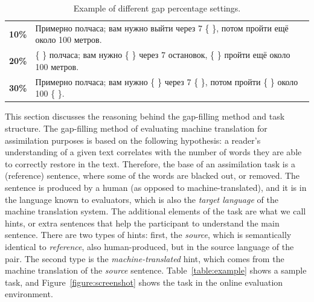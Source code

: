 \documentclass[11pt]{article}
\newcommand{\comment}[1]{\marginpar{\scriptsize\sf \textcolor{blue}{#1}}}
\newcommand{\rus}[1]{\foreignlanguage{russian}{#1}}
\begin{document}
\begin{table}
  \begin{tabular}{|l|l|}
  \hline
     \hline
     \textbf{10\%}   & \rus{Примерно полчаса; вам нужно выйти через 7 \{ \}, потом пройти ещё около 100 метров.} \\
     \textbf{20\%}   & \rus{\{ \} полчаса; вам нужно \{ \} через 7 остановок, \{ \} пройти ещё около 100 метров.} \\
     \textbf{30\%} & \rus{Примерно полчаса; вам нужно \{ \} через 7 \{ \}, потом пройти \{ \} около 100 \{ \}.} \\
     \hline
  \end{tabular}
  \caption{Example of different gap percentage settings.} 
  \label{table:percentage}
\end{table}


This section discusses the reasoning behind the gap-filling method and task structure. The gap-filling method 
of evaluating machine translation for assimilation purposes is based on the following hypothesis: a reader's understanding 
of a given text correlates with the number of words they are able to correctly restore in the text. Therefore, the 
base of an assimilation task is a (reference) sentence, where some of the words are blacked out, or removed. The sentence \comment{EA: I'm sorry, I'm not sure what else I could explain here...}
is produced by a human (as opposed to machine-translated), and it is in the language known to evaluators, which is also 
the \emph{target language} of the machine translation system.
The additional elements of the task are what we call hints, or extra sentences that help the participant to understand 
the main sentence. There are two types of hints: first, the \emph{source}, which is semantically identical to \emph{reference}, 
also human-produced, but in the source language of the pair. The second type is the \emph{machine-translated} hint, which 
comes from the machine translation of the \emph{source} sentence. Table~\ref{table:example} shows a sample task, and Figure~\ref{figure:screenshot} shows the task in the online evaluation environment.
\end{document}
